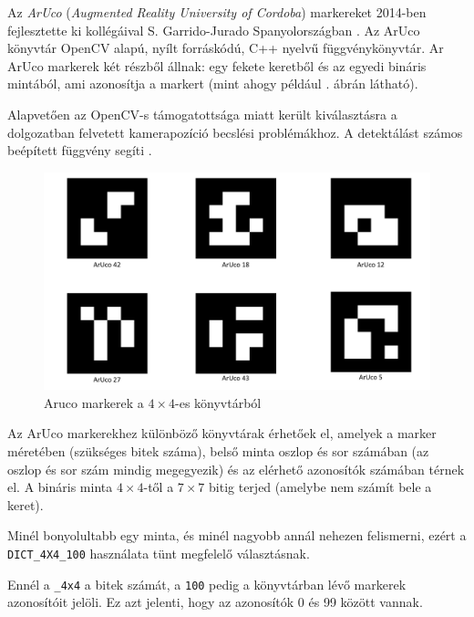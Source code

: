 
Az \textit{ArUco} (\textit{Augmented Reality University of Cordoba}) markereket 2014-ben fejlesztette ki kollégáival S. Garrido-Jurado Spanyolországban \cite{avola2016practical}.
Az ArUco könyvtár OpenCV alapú, nyílt forráskódú, C++ nyelvű függvénykönyvtár.
Ar ArUco markerek két részből állnak: egy fekete keretből és az egyedi bináris mintából, ami azonosítja a markert (mint ahogy például . ábrán látható).

Alapvetően az OpenCV-s támogatottsága miatt került kiválasztásra a dolgozatban felvetett kamerapozíció becslési problémákhoz. A detektálást számos beépített függvény segíti \cite{garrido2018opencv}.

\begin{figure}[htp]
    \centering
   	\includegraphics[scale=0.4]{images/kep.png}
	\caption{Aruco markerek a $4 \times 4$-es könyvtárból}
	\label{fig:kep}
\end{figure}


Az ArUco markerekhez különböző könyvtárak érhetőek el, amelyek a marker méretében (szükséges bitek száma), belső minta oszlop és sor számában (az oszlop és sor szám mindig megegyezik) és az elérhető azonosítók számában térnek el.
A bináris minta $4 \times 4$-től a $7 \times 7$ bitig terjed (amelybe nem számít bele a keret).

Minél bonyolultabb egy minta, és minél nagyobb annál nehezen felismerni, ezért a \texttt{DICT\_4X4\_100} használata tünt megfelelő választásnak.

Ennél a \texttt{\_4x4} a bitek számát, a \texttt{100} pedig a könyvtárban lévő markerek azonosítóit jelöli.
Ez azt jelenti, hogy az azonosítók 0 és 99 között vannak.

